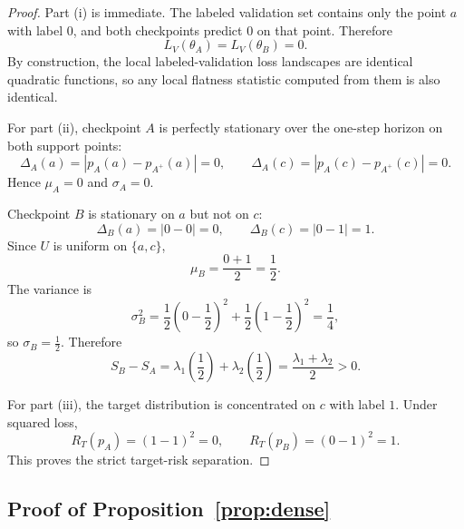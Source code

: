 \documentclass{article}
\begin{document}
\begin{proof}
Part (i) is immediate. The labeled validation set contains only the point $a$ with label $0$, and both checkpoints predict $0$ on that point. Therefore
\begin{equation}
    L_V(\theta_A)=L_V(\theta_B)=0.
\end{equation}
By construction, the local labeled-validation loss landscapes are identical quadratic functions, so any local flatness statistic computed from them is also identical.

For part (ii), checkpoint $A$ is perfectly stationary over the one-step horizon on both support points:
\begin{equation}
    \Delta_A(a)=|p_A(a)-p_{A^+}(a)|=0,
    \qquad
    \Delta_A(c)=|p_A(c)-p_{A^+}(c)|=0.
\end{equation}
Hence $\mu_A=0$ and $\sigma_A=0$.

Checkpoint $B$ is stationary on $a$ but not on $c$:
\begin{equation}
    \Delta_B(a)=|0-0|=0,
    \qquad
    \Delta_B(c)=|0-1|=1.
\end{equation}
Since $U$ is uniform on $\{a,c\}$,
\begin{equation}
    \mu_B = \frac{0+1}{2}=\frac{1}{2}.
\end{equation}
The variance is
\begin{equation}
    \sigma_B^2
    =
    \frac{1}{2}\left(0-\frac{1}{2}\right)^2 + \frac{1}{2}\left(1-\frac{1}{2}\right)^2
    =
    \frac{1}{4},
\end{equation}
so $\sigma_B=\frac{1}{2}$. Therefore
\begin{equation}
    S_B-S_A
    =
    \lambda_1\left(\frac{1}{2}\right)+\lambda_2\left(\frac{1}{2}\right)
    =
    \frac{\lambda_1+\lambda_2}{2}
    >
    0.
\end{equation}

For part (iii), the target distribution is concentrated on $c$ with label $1$. Under squared loss,
\begin{equation}
    R_T(p_A) = (1-1)^2 = 0,
    \qquad
    R_T(p_B) = (0-1)^2 = 1.
\end{equation}
This proves the strict target-risk separation.
\end{proof}

\subsection{Proof of Proposition~\ref{prop:dense}}
\end{document}
